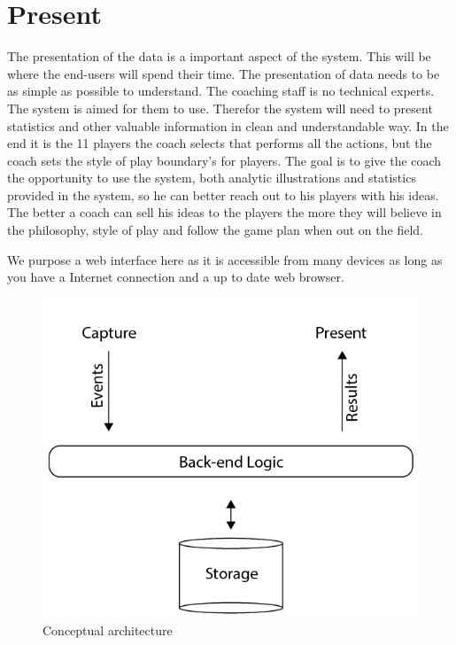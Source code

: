 \section{Present}

The presentation of the data is a important aspect of the system. This will be where the end-users will spend their time. The presentation of data needs to be as simple as possible to understand. The coaching staff is no technical experts. The system is  aimed for them to use. Therefor the system will need to present statistics and other valuable information in clean and understandable way. In the end it is the 11 players the coach selects that performs all the actions, but the coach sets the style of play boundary's for players. The goal is to give the coach the opportunity to use the system, both analytic illustrations and statistics provided in the system, so he can better reach out to his players with his ideas. The better a coach can sell his ideas to the players the more they will believe in the philosophy, style of play and follow the game plan when out on the field.

We purpose a web interface here as it is accessible from many devices as long as you have a Internet connection and a up to date web browser. 



\begin{figure}[ht!]
\centering
\includegraphics[width=150mm]{images/architecture/conceptual_architecture.png}
\caption{Conceptual architecture}
\end{figure}